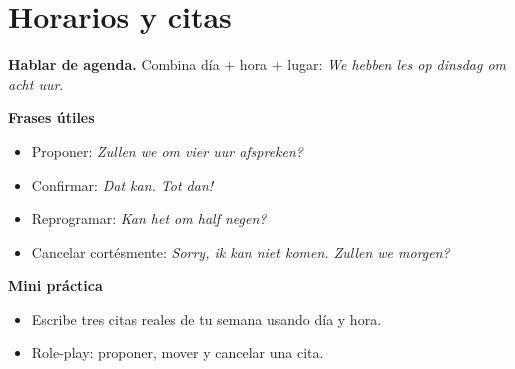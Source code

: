 \section{Horarios y citas}
\textbf{Hablar de agenda.} Combina día + hora + lugar: \textit{We hebben les op dinsdag om acht uur}.

\textbf{Frases útiles}
\begin{itemize}[leftmargin=*]
  \item Proponer: \textit{Zullen we om vier uur afspreken?}
  \item Confirmar: \textit{Dat kan. Tot dan!}
  \item Reprogramar: \textit{Kan het om half negen?}
  \item Cancelar cortésmente: \textit{Sorry, ik kan niet komen. Zullen we morgen?}
\end{itemize}

\textbf{Mini práctica}
\begin{itemize}[leftmargin=*]
  \item Escribe tres citas reales de tu semana usando día y hora.
  \item Role-play: proponer, mover y cancelar una cita.
\end{itemize}
